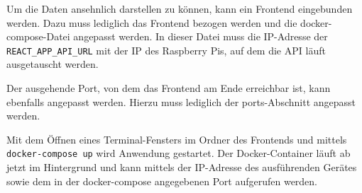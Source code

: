 \documentclass[a4paper,
    11pt,
    headings=small,
    ngerman,
    listof=totoc,
    numbers=noenddot]{scrreprt}[2021/11/13]
\begin{document}
Um die Daten ansehnlich darstellen zu können, kann ein Frontend eingebunden werden. Dazu muss lediglich das Frontend bezogen werden und die docker-compose-Datei angepasst werden. In dieser Datei muss die IP-Adresse der \texttt{REACT\_APP\_API\_URL} mit der IP des Raspberry Pis, auf dem die \ac{API} läuft ausgetauscht werden.

Der ausgehende Port, von dem das Frontend am Ende erreichbar ist, kann ebenfalls angepasst werden. Hierzu muss lediglich der ports-Abschnitt angepasst werden.

Mit dem Öffnen eines Terminal-Fensters im Ordner des Frontends und mittels \texttt{docker-compose up} wird Anwendung gestartet. Der Docker-Container läuft ab jetzt im Hintergrund und kann mittels der IP-Adresse des ausführenden Gerätes sowie dem in der docker-compose angegebenen Port aufgerufen werden.


\newpage

\printbibliography
\end{document}
